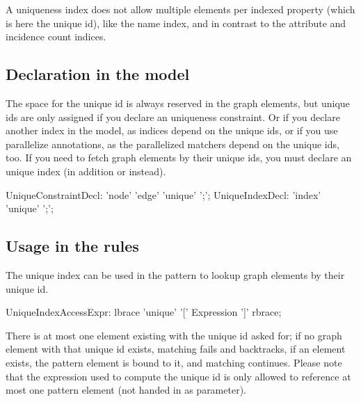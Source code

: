A uniqueness index does not allow multiple elements per indexed property (which is here the unique id), like the name index, and in contrast to the attribute and incidence count indices.

\subsection*{Declaration in the model}
The space for the unique id is always reserved in the graph elements, but unique ids are only assigned if you declare an uniqueness constraint.
Or if you declare another index in the model, as indices depend on the unique ids, or if you use parallelize annotations, as the parallelized matchers depend on the unique ids, too.
If you need to fetch graph elements by their unique ids, you must declare an unique index (in addition or instead).

\begin{rail}
  UniqueConstraintDecl: 'node' 'edge' 'unique' ';';
  UniqueIndexDecl: 'index' 'unique' ';';
\end{rail}


\subsection*{Usage in the rules}
The unique index can be used in the pattern to lookup graph elements by their unique id.

\begin{rail}
  UniqueIndexAccessExpr:
    lbrace 'unique' '[' Expression ']' rbrace;
\end{rail}

There is at most one element existing with the unique id asked for; if no graph element with that unique id exists, matching fails and backtracks, if an element exists, the pattern element is bound to it, and matching continues.
Please note that the expression used to compute the unique id is only allowed to reference at most one pattern element (not handed in as parameter).

